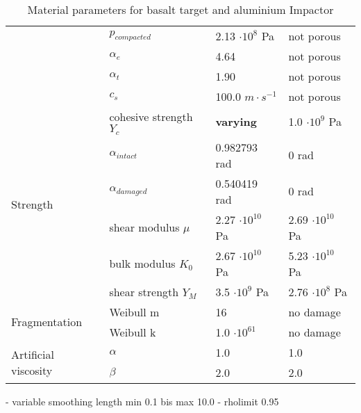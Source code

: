 \begin{table}
\begin{tabular}{ |l|l|l|l| }
                                              & $p_{compacted}$         & 2.13 $\cdot 10^8$ Pa             & not porous                       \\
                                              & $\alpha_e$              & 4.64                             & not porous                       \\
                                              & $\alpha_t$              & 1.90                             & not porous                       \\
                                              & $c_s$                   & 100.0 $m\cdot s^{-1}$            & not porous                       \\ \hline
        \multirow{6}{*}{Strength}             & cohesive strength $Y_c$ & \textbf{varying}                 & 1.0 $\cdot 10^9$ Pa              \\
                                              & $\alpha_{intact}$       & 0.982793 rad                     & 0 rad                            \\
                                              & $\alpha_{damaged}$      & 0.540419 rad                     & 0 rad                            \\
                                              & shear modulus $\mu$     & 2.27 $\cdot 10^{10}$ Pa          & 2.69 $\cdot 10^{10}$ Pa          \\
                                              & bulk modulus $K_0$      & 2.67 $\cdot 10^{10}$ Pa          & 5.23 $\cdot 10^{10}$ Pa          \\
                                              & shear strength $Y_M$    & 3.5 $\cdot 10^9$ Pa              & 2.76 $\cdot 10^8$ Pa             \\ \hline
        \multirow{2}{*}{Fragmentation}        & Weibull m               & 16                               & no damage                        \\
                                              & Weibull k               & 1.0 $\cdot 10^{61}$              & no damage                        \\ \hline
        \multirow{2}{*}{Artificial viscosity} & $\alpha$                & 1.0                              & 1.0                              \\
                                              & $\beta$                 & 2.0                              & 2.0                              \\ \hline
        \hline
    \end{tabular}
    \caption{Material parameters for basalt target and aluminium Impactor}
    \label{tab:material_parameters}
\end{table}

- variable smoothing length min 0.1 bis max 10.0
- rholimit 0.95